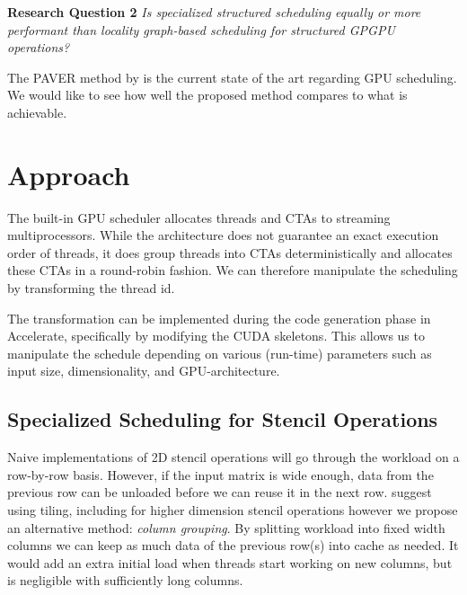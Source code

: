\documentclass{article}
\begin{document}
\begin{mdframed}
    \textbf{Research Question 2}
    \emph{Is specialized structured scheduling equally or more performant than locality graph-based scheduling for structured GPGPU operations?}
\end{mdframed}
The PAVER method by \citet{tripathy2021paver} is the current state of the art regarding GPU scheduling.
We would like to see how well the proposed method compares to what is achievable.

\section{Approach}
The built-in GPU scheduler allocates threads and CTAs to streaming multiprocessors.
While the architecture does not guarantee an exact execution order of threads, it does group threads into CTAs deterministically and allocates these CTAs in a round-robin fashion.
We can therefore manipulate the scheduling by transforming the thread id.

The transformation can be implemented during the code generation phase in Accelerate, specifically by modifying the CUDA skeletons.
This allows us to manipulate the schedule depending on various (run-time) parameters such as input size, dimensionality, and GPU-architecture.

\subsection{Specialized Scheduling for Stencil Operations}
\label{sec:stencil_schedule}
Naive implementations of 2D stencil operations will go through the workload on a row-by-row basis.
However, if the input matrix is wide enough, data from the previous row can be unloaded before we can reuse it in the next row.
\citet{rivera2000tiling} suggest using tiling, including for higher dimension stencil operations however we propose an alternative method: \emph{column grouping}.
By splitting workload into fixed width columns we can keep as much data of the previous row(s) into cache as needed.
It would add an extra initial load when threads start working on new columns, but is negligible with sufficiently long columns.
\end{document}
